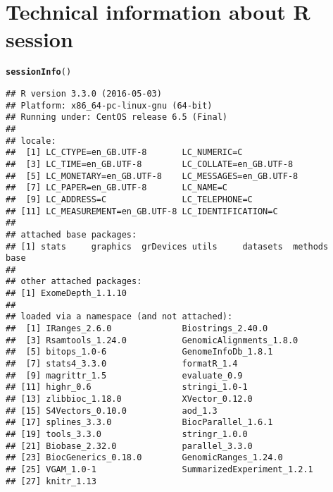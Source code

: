 \documentclass[10pt]{article}\usepackage[]{graphicx}\usepackage[]{color}
\makeatletter
\newcommand{\hlstd}[1]{\textcolor[rgb]{0.345,0.345,0.345}{#1}}%
\newcommand{\hlkwd}[1]{\textcolor[rgb]{0.737,0.353,0.396}{\textbf{#1}}}%
\newenvironment{kframe}{%
 \def\at@end@of@kframe{}%
 \ifinner\ifhmode%
  \def\at@end@of@kframe{\end{minipage}}%
  \begin{minipage}{\columnwidth}%
 \fi\fi%
 \def\FrameCommand##1{\hskip\@totalleftmargin \hskip-\fboxsep
 \colorbox{shadecolor}{##1}\hskip-\fboxsep
     \hskip-\linewidth \hskip-\@totalleftmargin \hskip\columnwidth}%
 \MakeFramed {\advance\hsize-\width
   \@totalleftmargin\z@ \linewidth\hsize
   \@setminipage}}%
 {\par\unskip\endMakeFramed%
 \at@end@of@kframe}
\newenvironment{knitrout}{}{} %
\makeatother
\begin{document}
\section{Technical information about R session}

\begin{knitrout}
\color{fgcolor}\begin{kframe}
\begin{alltt}
\hlkwd{sessionInfo}\hlstd{()}
\end{alltt}
\begin{verbatim}
## R version 3.3.0 (2016-05-03)
## Platform: x86_64-pc-linux-gnu (64-bit)
## Running under: CentOS release 6.5 (Final)
## 
## locale:
##  [1] LC_CTYPE=en_GB.UTF-8       LC_NUMERIC=C              
##  [3] LC_TIME=en_GB.UTF-8        LC_COLLATE=en_GB.UTF-8    
##  [5] LC_MONETARY=en_GB.UTF-8    LC_MESSAGES=en_GB.UTF-8   
##  [7] LC_PAPER=en_GB.UTF-8       LC_NAME=C                 
##  [9] LC_ADDRESS=C               LC_TELEPHONE=C            
## [11] LC_MEASUREMENT=en_GB.UTF-8 LC_IDENTIFICATION=C       
## 
## attached base packages:
## [1] stats     graphics  grDevices utils     datasets  methods   base     
## 
## other attached packages:
## [1] ExomeDepth_1.1.10
## 
## loaded via a namespace (and not attached):
##  [1] IRanges_2.6.0              Biostrings_2.40.0         
##  [3] Rsamtools_1.24.0           GenomicAlignments_1.8.0   
##  [5] bitops_1.0-6               GenomeInfoDb_1.8.1        
##  [7] stats4_3.3.0               formatR_1.4               
##  [9] magrittr_1.5               evaluate_0.9              
## [11] highr_0.6                  stringi_1.0-1             
## [13] zlibbioc_1.18.0            XVector_0.12.0            
## [15] S4Vectors_0.10.0           aod_1.3                   
## [17] splines_3.3.0              BiocParallel_1.6.1        
## [19] tools_3.3.0                stringr_1.0.0             
## [21] Biobase_2.32.0             parallel_3.3.0            
## [23] BiocGenerics_0.18.0        GenomicRanges_1.24.0      
## [25] VGAM_1.0-1                 SummarizedExperiment_1.2.1
## [27] knitr_1.13
\end{verbatim}
\end{kframe}
\end{knitrout}
\end{document}
